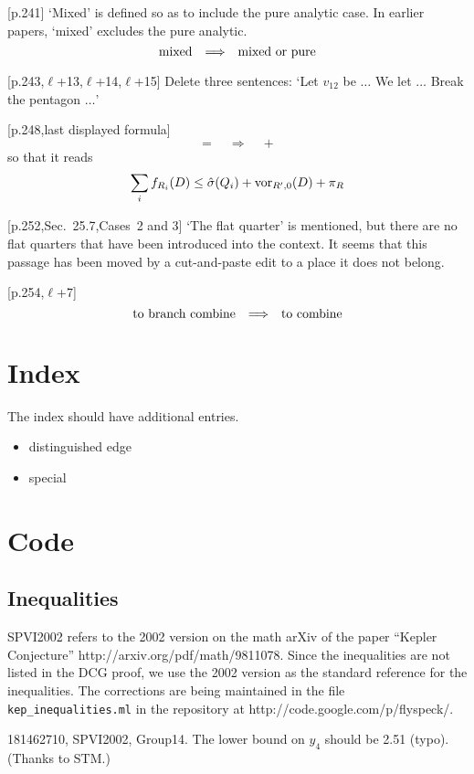 \documentclass[11pt]{amsart}
\def\op#1{{\text{#1}}}
\def\to{{\quad\Longrightarrow\quad}}
\def\line{$\ell$}
\def\text{\hbox}
\begin{document}
[p.241]  `Mixed' is defined so as to include
the pure analytic case.  In earlier papers,
`mixed' excludes the pure analytic.  
	$$
	\text{mixed}\to\text{mixed or pure}
	$$
	
[p.243,\line+13,\line+14,\line+15]
	Delete three sentences:
	`Let $v_{12}$ be $\ldots$  We let $\ldots$
	 Break the pentagon $\ldots$'
	
[p.248,last displayed formula]  
	$$
	= \to +
	$$
so that it reads
	$$
	\sum_i f_{R_i}(D) \le \hat\sigma(Q_i) +
	\op{vor}_{R',0}(D) + \pi_R
	$$

[p.252,Sec.~25.7,Cases~2 and 3]  `The flat quarter'
is mentioned, but there are no flat quarters
that have been introduced into the context.  
It seems that this passage
has been moved by a cut-and-paste edit to a
place it does not belong.

[p.254,\line+7]
	$$
	\text{to branch combine} \to \text{to combine}
	$$




\section{Index}

The index should have additional entries.
\begin{itemize}
	\item [p.128] distinguished edge
	\item [p.128] special
\end{itemize}

\section{Code}

\subsection{Inequalities}  

SPVI2002 refers to the 2002 version on the math arXiv of the paper
``Kepler Conjecture''  http://arxiv.org/pdf/math/9811078.
Since the inequalities are not listed in the DCG proof, we use the 2002 version as the standard reference for the inequalities.  The corrections are being maintained in the file {\tt kep\_inequalities.ml} in the repository at http://code.google.com/p/flyspeck/.

\smallskip

181462710, SPVI2002, Group14.  The lower bound on $y_4$ should be 2.51 (typo).
(Thanks to STM.)
\end{document}
